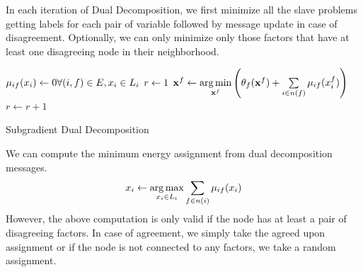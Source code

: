 \documentclass[letterpaper, 10 pt, conference]{ieeeconf} %
\DeclareMathOperator*{\argmin}{arg\,min}
\DeclareMathOperator*{\argmax}{arg\,max}
\newcommand{\vect}[1]{\mathbf{#1}}
\begin{document}
In each iteration of Dual Decomposition, we first minimize all the slave problems getting labels for each pair of variable followed by message update in case of disagreement. Optionally, we can only minimize only those factors that have at least one disagreeing node in their neighborhood.

\begin{algorithm}
  \dontprintsemicolon

  $\msg{i}{f}{x_i} \assign 0 \hfill \forall (i, f) \in E, x_i \in \Sx$\;
  $r \leftarrow 1$\;
   {
     {%
      $\vect{x}^f \assign \argmin\limits_{\vect{x}^f} \left( \theta_f(\vect{x}^f) + \sum\limits_{i \in n(f)}\msg{i}{f}{x^f_i} \right)$\;
    }
     {
    }
    $r \leftarrow r + 1$\;
  }
  \label{alg:dualdecompostion}
  \caption{Subgradient Dual Decomposition}
\end{algorithm}
We can compute the minimum energy assignment from dual decomposition messages.
\begin{align}
  x_i \assign \argmax\limits_{x_i \in \Sx} \sum\limits_{f \in n(i)} \msg{i}{f}{x_i}
\end{align}
However, the above computation is only valid if the node has at least a pair of disagreeing factors. In case of agreement, we simply take the agreed upon assignment or if the node is not connected to any factors, we take a random assignment.
\end{document}
